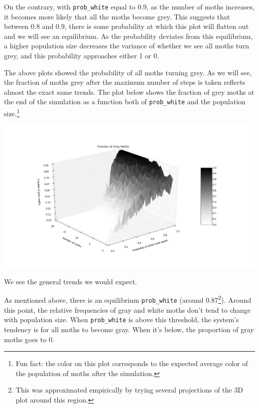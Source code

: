 \documentclass[leqno]{article}
\begin{document}
On the contrary, with {\tt prob\_white} equal to 0.9, as the number of moths increases, it becomes more likely that all the moths become grey. This suggests that between 0.8 and 0.9, there is some probability at which this plot will flatten out and we will see an equilibrium. As the probability deviates from this equilibrium, a higher population size decreases the variance of whether we see all moths turn grey, and this probability approaches either 1 or 0. 

\newpage
The above plots showed the probability of all moths turning grey. As we will see, the fraction of moths grey after the maximum number of steps is taken reflects almost the exact same trends. The plot below shows the fraction of grey moths at the end of the simulation as a function both of {\tt prob\_white} and the population size.\footnote{Fun fact: the color on this plot corresponds to the expected average color of the population of moths after the simulation.} 

\begin{center}
\includegraphics[width=6in]{moth_color.png}
\end{center}

We see the general trends we would expect. 


As mentioned above, there is an equilibrium {\tt prob\_white} (around 0.87\footnote{This was approximated empirically by trying several projections of the 3D plot around this region.
}). Around this point, the relative frequencies of gray and white moths don't tend to change with population size. When {\tt prob\_white} is above this threshold, the system's tendency is for all moths to become gray. When it's below, the proportion of gray moths goes to $0$. 
\end{document}
